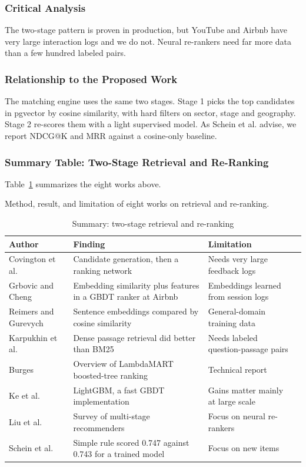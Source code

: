 \documentclass{FastFyp}
\makeatletter
\newcommand{\capdesc}[1]{%
  \par\nobreak
  \begingroup
  \setstretch{1}%
  \ifdefstring{\@captype}{figure}%
    {\vspace{0.2\baselineskip}}%
    {\vspace{-0.8\baselineskip}}%
  {\centering\normalfont\itshape\small
   \begin{minipage}{0.92\textwidth}\centering #1\end{minipage}\par}%
  \endgroup
  \vspace{0.4\baselineskip}%
}
\makeatother
\begin{document}
\subsubsection{Critical Analysis}
The two-stage pattern is proven in production, but YouTube and Airbnb have very large interaction logs and we do not. Neural re-rankers need far more data than a few hundred labeled pairs.

\subsubsection{Relationship to the Proposed Work}
The matching engine uses the same two stages. Stage 1 picks the top candidates in pgvector by cosine similarity, with hard filters on sector, stage and geography. Stage 2 re-scores them with a light supervised model. As Schein et al. advise, we report NDCG@K and MRR against a cosine-only baseline.

\subsubsection{Summary Table: Two-Stage Retrieval and Re-Ranking}
Table~\ref{tab:lr-retrieval} summarizes the eight works above.
\begin{table}[!ht]
\centering
\caption{Summary: two-stage retrieval and re-ranking}
\capdesc{Method, result, and limitation of eight works on retrieval and re-ranking.}
\begin{tabular}{|p{3.0cm}|p{4.0cm}|p{2.8cm}|p{4.0cm}|}
\hline
\textbf{Author} & \textbf{Finding} & \textbf{Limitation} \\
\hline
Covington et al. \cite{ref:covington2016} & Candidate generation, then a ranking network & Needs very large feedback logs \\
\hline
Grbovic and Cheng \cite{ref:grbovic2018} & Embedding similarity plus features in a GBDT ranker at Airbnb & Embeddings learned from session logs \\
\hline
Reimers and Gurevych \cite{ref:reimers2019} & Sentence embeddings compared by cosine similarity & General-domain training data \\
\hline
Karpukhin et al. \cite{ref:karpukhin2020} & Dense passage retrieval did better than BM25 & Needs labeled question-passage pairs \\
\hline
Burges \cite{ref:burges2010} & Overview of LambdaMART boosted-tree ranking & Technical report \\
\hline
Ke et al. \cite{ref:ke2017} & LightGBM, a fast GBDT implementation & Gains matter mainly at large scale \\
\hline
Liu et al. \cite{ref:liu2022rerank} & Survey of multi-stage recommenders & Focus on neural re-rankers \\
\hline
Schein et al. \cite{ref:schein2002} & Simple rule scored 0.747 against 0.743 for a trained model & Focus on new items \\
\hline
\end{tabular}
\label{tab:lr-retrieval}
\end{table}
\end{document}
